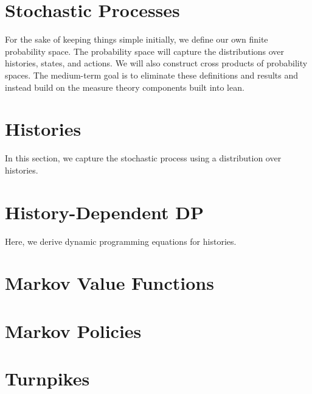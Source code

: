 %


\section{Stochastic Processes}

For the sake of keeping things simple initially, we define our own finite probability space. The probability space will capture the distributions over histories, states, and actions. We will also construct cross products of probability spaces. The medium-term goal is to eliminate these definitions and results and instead build on the measure theory components built into lean.



\section{Histories}

In this section, we capture the stochastic process using a distribution over histories.

\section{History-Dependent DP}

Here, we derive dynamic programming equations for histories.

\section{Markov Value Functions}


\section{Markov Policies}

\section{Turnpikes}
